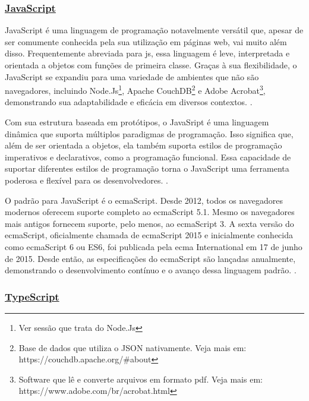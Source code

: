 \subsubsection{\underline{JavaScript}}

JavaScript é uma linguagem de programação notavelmente versátil que, apesar de ser
comumente conhecida pela sua utilização em páginas
\acrshort{web}, vai muito além disso.
Frequentemente abreviada para 
\acrshort{js}, essa linguagem é leve, interpretada e orientada a objetos
com funções de primeira classe. Graças à sua flexibilidade, o JavaScript se expandiu para uma
variedade de ambientes que não são navegadores, incluindo
Node.Js\footnote{Ver sessão que trata do Node.Js
},
Apache CouchDB\footnote{Base de dados que utiliza o JSON nativamente. Veja mais em:  \\ https://couchdb.apache.org/\#about
}
e
Adobe Acrobat\footnote{Software que lê e converte arquivos em formato
    \acrshort{pdf}. Veja mais em:  \\ https://www.adobe.com/br/acrobat.html
},
demonstrando sua adaptabilidade e eficácia em diversos contextos.
\cite{mdn-js}.

Com sua estrutura baseada em protótipos, o JavaSript é uma linguagem dinâmica que
suporta múltiplos paradigmas de programação. Isso significa que, além de ser orientada a
objetos, ela também suporta estilos de programação imperativos e declarativos, como a
programação funcional. Essa capacidade de suportar diferentes estilos de programação torna o
JavaScript uma ferramenta poderosa e flexível para os desenvolvedores.
\cite{mdn-js}.

O padrão para JavaScript é o
\acrshort{ecma}Script.
Desde 2012, todos os navegadores
modernos oferecem suporte completo ao
\acrshort{ecma}Script 5.1. Mesmo os navegadores mais
antigos fornecem suporte, pelo menos, ao
\acrshort{ecma}Script 3. A sexta versão do
\acrshort{ecma}Script,
oficialmente chamada de
\acrshort{ecma}Script 2015 e inicialmente conhecida como
\acrshort{ecma}Script 6
ou ES6, foi publicada pela \acrshort{ecma} International
em 17 de junho de 2015. Desde então, as
especificações do
\acrshort{ecma}Script são lançadas anualmente, demonstrando o desenvolvimento
contínuo e o avanço dessa linguagem padrão.
\cite{mdn-js}.

\subsubsection{\underline{TypeScript}}

